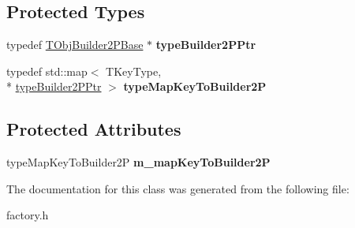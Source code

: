\subsection*{Protected Types}
\begin{DoxyCompactItemize}
\item 
\hypertarget{class_t_obj_factory2_p_afe5b9fd7b27108d26fda849bb1137812}{typedef \hyperlink{class_t_obj_factory2_p_1_1_t_obj_builder2_p_base}{T\+Obj\+Builder2\+P\+Base} $\ast$ {\bfseries type\+Builder2\+P\+Ptr}}\label{class_t_obj_factory2_p_afe5b9fd7b27108d26fda849bb1137812}

\item 
\hypertarget{class_t_obj_factory2_p_ac221cef5a3d8aa10fcdfa822edd80cb3}{typedef std\+::map$<$ T\+Key\+Type, \\*
\hyperlink{class_t_obj_factory2_p_1_1_t_obj_builder2_p_base}{type\+Builder2\+P\+Ptr} $>$ {\bfseries type\+Map\+Key\+To\+Builder2\+P}}\label{class_t_obj_factory2_p_ac221cef5a3d8aa10fcdfa822edd80cb3}

\end{DoxyCompactItemize}
\subsection*{Protected Attributes}
\begin{DoxyCompactItemize}
\item 
\hypertarget{class_t_obj_factory2_p_a5bdec079836fa6f6aaae9a0f8b1a874e}{type\+Map\+Key\+To\+Builder2\+P {\bfseries m\+\_\+map\+Key\+To\+Builder2\+P}}\label{class_t_obj_factory2_p_a5bdec079836fa6f6aaae9a0f8b1a874e}

\end{DoxyCompactItemize}


The documentation for this class was generated from the following file\+:\begin{DoxyCompactItemize}
\item 
factory.\+h\end{DoxyCompactItemize}
